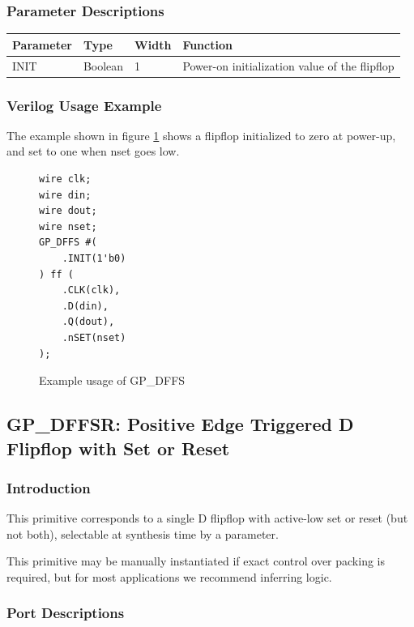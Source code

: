 \documentclass[11pt]{article}
\begin{document}
\subsubsection{Parameter Descriptions}

\begin{tabularx}{5in}{|l|l|l|X|}
\hline
{\bfseries Parameter} & {\bfseries Type} & {\bfseries Width} & {\bfseries Function} \\
\hline
INIT & Boolean & 1 & Power-on initialization value of the flipflop \\
\hline
\end{tabularx}

\subsubsection{Verilog Usage Example}

The example shown in figure \ref{gp-dffs-example} shows a flipflop initialized to zero at power-up, and set to one
when nset goes low.

\begin{figure}[h]
\begin{lstlisting}
wire clk;
wire din;
wire dout;
wire nset;
GP_DFFS #(
	.INIT(1'b0)
) ff (
	.CLK(clk),
	.D(din),
	.Q(dout),
	.nSET(nset)
);
\end{lstlisting}
\caption{Example usage of GP\_DFFS}
\label{gp-dffs-example}
\end{figure}


\pagebreak
\subsection{GP\_DFFSR: Positive Edge Triggered D Flipflop with Set or Reset}

\subsubsection{Introduction}
This primitive corresponds to a single D flipflop with active-low set or reset (but not both), selectable at synthesis 
time by a parameter.

This primitive may be manually instantiated if exact control over packing is required, but for most applications we 
recommend inferring logic.

\subsubsection{Port Descriptions}
\end{document}
